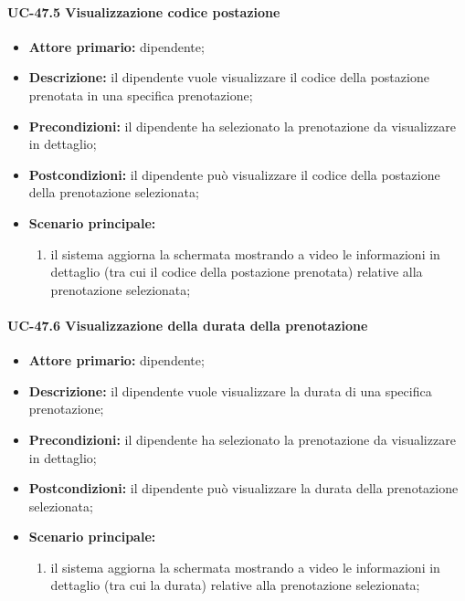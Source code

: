\paragraph{UC-47.5 Visualizzazione codice postazione}

    \begin{itemize}
        \item \textbf{Attore primario:} dipendente;

        \item \textbf{Descrizione:} il dipendente vuole visualizzare il codice della postazione prenotata in una specifica prenotazione;

        \item \textbf{Precondizioni:} il dipendente ha selezionato la prenotazione da visualizzare in dettaglio;

        \item \textbf{Postcondizioni:} il dipendente può visualizzare il codice della postazione della prenotazione selezionata;

        \item \textbf{Scenario principale:}
            \begin{enumerate}
                \item il sistema aggiorna la schermata mostrando a video le informazioni in dettaglio (tra cui il codice della postazione prenotata) relative alla prenotazione selezionata;
            \end{enumerate}
    \end{itemize} 

\paragraph{UC-47.6 Visualizzazione della durata della prenotazione}

    \begin{itemize}
        \item \textbf{Attore primario:} dipendente;

        \item \textbf{Descrizione:} il dipendente vuole visualizzare la durata di una specifica prenotazione;

        \item \textbf{Precondizioni:} il dipendente ha selezionato la prenotazione da visualizzare in dettaglio;

        \item \textbf{Postcondizioni:} il dipendente può visualizzare la durata della prenotazione selezionata;

        \item \textbf{Scenario principale:}
            \begin{enumerate}
                \item il sistema aggiorna la schermata mostrando a video le informazioni in dettaglio (tra cui la durata) relative alla prenotazione selezionata;
            \end{enumerate}
    \end{itemize} 


